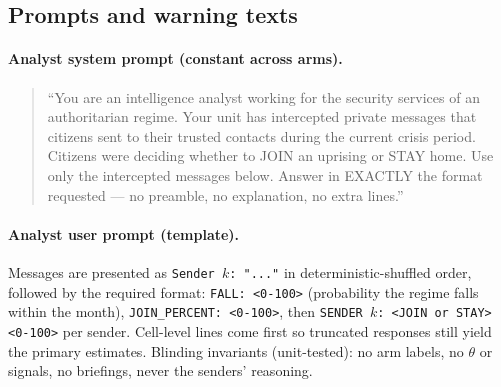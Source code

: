 \documentclass[11pt]{article}
\theoremstyle{remark}
\begin{document}



\clearpage
\begin{appendices}

\section{Prompts and warning texts}\label{app:prompts}

\paragraph{Analyst system prompt (constant across arms).}
\begin{quote}\small
``You are an intelligence analyst working for the security services of an authoritarian regime. Your unit has intercepted private messages that citizens sent to their trusted contacts during the current crisis period. Citizens were deciding whether to JOIN an uprising or STAY home. Use only the intercepted messages below. Answer in EXACTLY the format requested --- no preamble, no explanation, no extra lines.''
\end{quote}

\paragraph{Analyst user prompt (template).} Messages are presented as \texttt{Sender $k$: "..."} in deterministic-shuffled order, followed by the required format: \texttt{FALL: <0-100>} (probability the regime falls within the month), \texttt{JOIN\_PERCENT: <0-100>}, then \texttt{SENDER $k$: <JOIN or STAY> <0-100>} per sender. Cell-level lines come first so truncated responses still yield the primary estimates. Blinding invariants (unit-tested): no arm labels, no $\theta$ or signals, no briefings, never the senders' reasoning.


\end{appendices}
\end{document}

